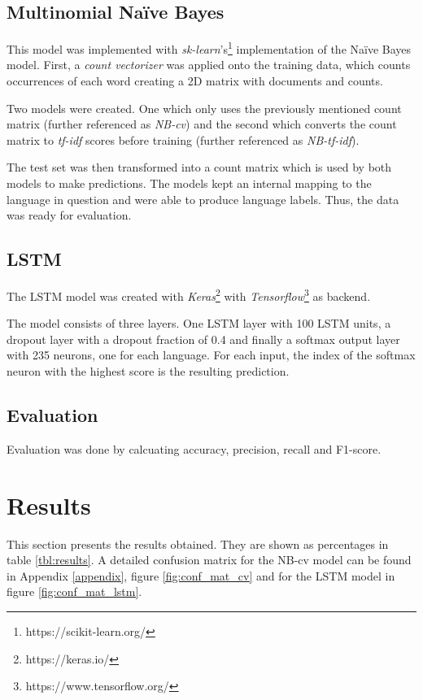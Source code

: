 \documentclass[conference]{IEEEtran}
\begin{document}
\subsection{Multinomial Naïve Bayes}
This model was implemented with \textit{sk-learn}'s\footnote{https://scikit-learn.org/} implementation of the Naïve Bayes model. First, a \textit{count vectorizer} was applied onto the training data, which counts occurrences of each word creating a 2D matrix with documents and counts.

Two models were created. One which only uses the previously mentioned count matrix (further referenced as \textit{NB-cv}) and the second which converts the count matrix to \textit{tf-idf} scores before training (further referenced as \textit{NB-tf-idf}).

The test set was then transformed into a count matrix which is used by both models to make predictions. The models kept an internal mapping to the language in question and were able to produce language labels. Thus, the data was ready for evaluation.

\subsection{LSTM}
The LSTM model was created with \textit{Keras}\footnote{https://keras.io/} with \textit{Tensorflow}\footnote{https://www.tensorflow.org/} as backend.

The model consists of three layers. One LSTM layer with 100 LSTM units, a dropout layer with a dropout fraction of 0.4 and finally a softmax output layer with 235 neurons, one for each language. For each input, the index of the softmax neuron with the highest score is the resulting prediction.

\subsection{Evaluation}
 Evaluation was done by calcuating accuracy, precision, recall and F1-score.

\section{Results}
This section presents the results obtained. They are shown as percentages in table \ref{tbl:results}. A detailed confusion matrix for the NB-cv model can be found in Appendix \ref{appendix}, figure \ref{fig:conf_mat_cv} and for the LSTM model in figure \ref{fig:conf_mat_lstm}. 
\end{document}
